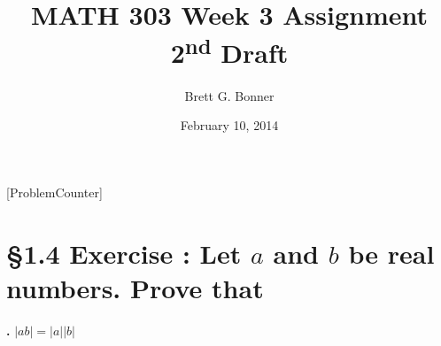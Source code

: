 \documentclass[a4paper,11pt]{article}
\begin{document}
\newtheorem*{theorem1}{Theorem}
\newtheorem*{theorem2}{Theorem}
\newtheorem*{theorem3}{Theorem}
\newtheorem*{theorem4}{Theorem}
\newtheorem*{theorem5}{Theorem}
\newtheorem*{theorem6}{Theorem}
\newtheorem*{theorem7}{Theorem}
\newtheorem*{theorem8}{Theorem}
\title{MATH 303 Week 3 Assignment 2\textsuperscript{nd} Draft}
\author{Brett G. Bonner}
\date{February 10, 2014}
\maketitle
\linespread{1.5}
[ProblemCounter]
\addtocounter{ProblemCounter}{6} %
\addtocounter{SubsectionCounter}{1} %
%

\section*{\S 1.4 Exercise : Let \( a\) and \( b \) be real numbers. Prove that}
\textbf{.}
\( |ab| = |a||b|\)
\end{document}
